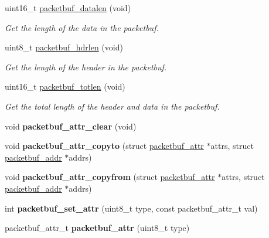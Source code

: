 \begin{DoxyCompactItemize}
uint16\+\_\+t \hyperlink{group__packetbuf_ga4a1157b882c15f5ea05d64f81d37115d}{packetbuf\+\_\+datalen} (void)
\begin{DoxyCompactList}\small\item\em Get the length of the data in the packetbuf. \end{DoxyCompactList}\item 
uint8\+\_\+t \hyperlink{group__packetbuf_ga591ff8749c8a62c45f4a32e38303ce5f}{packetbuf\+\_\+hdrlen} (void)
\begin{DoxyCompactList}\small\item\em Get the length of the header in the packetbuf. \end{DoxyCompactList}\item 
uint16\+\_\+t \hyperlink{group__packetbuf_ga3cc486f4d4f837db11c6376bee07ebcb}{packetbuf\+\_\+totlen} (void)
\begin{DoxyCompactList}\small\item\em Get the total length of the header and data in the packetbuf. \end{DoxyCompactList}\item 
\hypertarget{group__packetbuf_ga4fc3165c0161cb961492e6c9d83e5085}{}void {\bfseries packetbuf\+\_\+attr\+\_\+clear} (void)\label{group__packetbuf_ga4fc3165c0161cb961492e6c9d83e5085}

\item 
\hypertarget{group__packetbuf_ga510215a521924e7c7d343fc6e93887d5}{}void {\bfseries packetbuf\+\_\+attr\+\_\+copyto} (struct \hyperlink{structpacketbuf__attr}{packetbuf\+\_\+attr} $\ast$attrs, struct \hyperlink{structpacketbuf__addr}{packetbuf\+\_\+addr} $\ast$addrs)\label{group__packetbuf_ga510215a521924e7c7d343fc6e93887d5}

\item 
\hypertarget{group__packetbuf_gad32a9c0c337161884c9bf73481ef41c0}{}void {\bfseries packetbuf\+\_\+attr\+\_\+copyfrom} (struct \hyperlink{structpacketbuf__attr}{packetbuf\+\_\+attr} $\ast$attrs, struct \hyperlink{structpacketbuf__addr}{packetbuf\+\_\+addr} $\ast$addrs)\label{group__packetbuf_gad32a9c0c337161884c9bf73481ef41c0}

\item 
\hypertarget{group__packetbuf_ga98c48d863f9321f7da017af6542249e3}{}int {\bfseries packetbuf\+\_\+set\+\_\+attr} (uint8\+\_\+t type, const packetbuf\+\_\+attr\+\_\+t val)\label{group__packetbuf_ga98c48d863f9321f7da017af6542249e3}

\item 
\hypertarget{group__packetbuf_ga705d728750d2675cd3ca6354d1175040}{}packetbuf\+\_\+attr\+\_\+t {\bfseries packetbuf\+\_\+attr} (uint8\+\_\+t type)\label{group__packetbuf_ga705d728750d2675cd3ca6354d1175040}


\end{DoxyCompactItemize}
